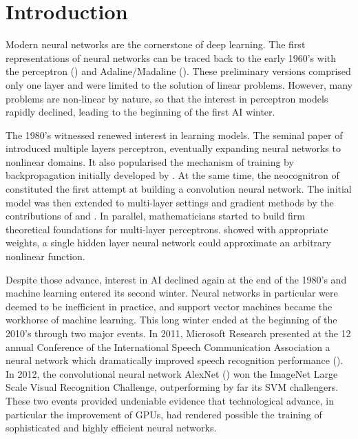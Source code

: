 \section{Introduction}
\label{sec1}


Modern neural networks are the cornerstone of deep learning. The first representations of neural networks can be traced back to the early 1960's with the perceptron (\cite{Rosenblatt1958}) and Adaline/Madaline (\cite{Widrow1960}). These preliminary versions comprised only one layer and were limited to the solution of linear problems. However, many problems are non-linear by nature, so that the interest in perceptron models rapidly declined, leading to the beginning of the first AI winter.


The 1980's witnessed renewed interest in learning models. The seminal paper of \cite{Rumelhart1986} introduced multiple layers perceptron, eventually expanding neural networks to nonlinear domains. It also popularised the mechanism of training by backpropagation initially developed by \cite{Werbos1974}. At the same time, the neocognitron of \cite{Fukushima1980} constituted the first attempt at building a convolution neural network. The initial model was then extended to multi-layer settings and gradient methods by the contributions of \cite{LeCun1989} and \cite{LeCun1998}. In parallel, mathematicians started to build firm theoretical foundations for multi-layer perceptrons. \cite{Hornik1991} showed with appropriate weights, a single hidden layer neural network could approximate an arbitrary nonlinear function.


Despite those advance, interest in AI declined again at the end of the 1980's and machine learning entered its second winter. Neural networks in particular were deemed to be inefficient in practice, and support vector machines became the workhorse of machine learning. This long winter ended at the beginning of the 2010's through two major events. In 2011, Microsoft Research presented at the 12 annual Conference of the International Speech Communication Association a neural network which dramatically improved speech recognition performance (\cite{Seide2011}). In 2012, the convolutional neural network AlexNet (\cite{Krizhevsky2012}) won the  ImageNet Large Scale Visual Recognition Challenge, outperforming by far its SVM challengers. These two events provided undeniable evidence that technological advance, in particular the improvement of GPUs, had rendered possible the training of sophisticated and highly efficient neural networks.


